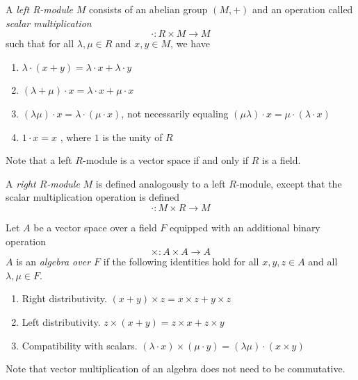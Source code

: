 \documentclass{article}
\begin{document}
\begin{definition}
  A \textit{left R-module} $M$ consists of an abelian group $(M, +)$ and an operation called \textit{scalar multiplication}
  \begin{equation}
    \cdot: R \times M \longrightarrow M
  \end{equation}
  such that for all $\lambda, \mu \in R$ and $x, y \in M$, we have 
  \begin{enumerate}
    \item $\lambda \cdot (x + y) = \lambda \cdot x + \lambda \cdot y$
    \item $(\lambda + \mu) \cdot x = \lambda \cdot x + \mu \cdot x$ 
    \item $(\lambda \mu) \cdot x = \lambda \cdot (\mu \cdot x )$, not necessarily equaling $(\mu \lambda) \cdot x = \mu \cdot (\lambda \cdot x)$
    \item $1 \cdot x = x$ , where $1$ is the unity of $R$
  \end{enumerate}
  Note that a left $R$-module is a vector space if and only if $R$ is a field.
\end{definition}

\begin{definition}
  A \textit{right $R$-module} $M$ is defined analogously to a left $R$-module, except that the scalar multiplication operation is defined
  \[ \cdot: M \times R \longrightarrow M \]
\end{definition}

\begin{definition}
  Let $A$ be a vector space over a field $F$ equipped with an additional binary operation 
  \begin{equation}
    \times: A \times A \longrightarrow A
  \end{equation}
  $A$ is an \textit{algebra over $F$} if the following identities hold for all $x, y, z \in A$ and all $\lambda, \mu \in F$. 
  \begin{enumerate}
    \item Right distributivity. $(x + y) \times z = x \times z + y \times z$ 
    \item Left distributivity. $z \times (x + y) = z \times x + z \times y$
    \item Compatibility with scalars. $(\lambda \cdot x ) \times (\mu \cdot y) = (\lambda \mu) \cdot (x \times y)$ 
  \end{enumerate}
\end{definition}

Note that vector multiplication of an algebra does not need to be commutative. 
\end{document}
